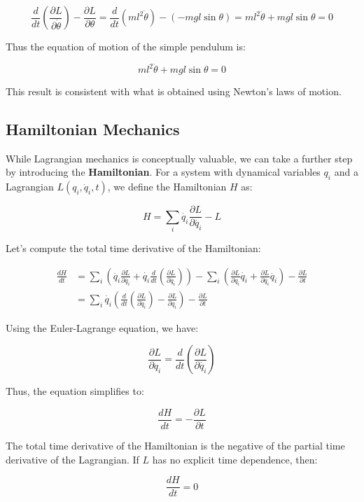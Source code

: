 \[
    \frac{d}{dt}\left(\frac{\partial L}{\partial\dot{\theta}}\right) - \frac{\partial L}{\partial\theta} = \frac{d}{dt}(ml^2\dot{\theta}) - (-mgl\sin{\theta})=ml^2\ddot{\theta}+mgl\sin{\theta}=0
\]

Thus the equation of motion of the simple pendulum is:

\[
    ml^2\ddot{\theta}+mgl\sin{\theta}=0
\]

This result is consistent with what is obtained using Newton's laws of motion.

\subsection{Hamiltonian Mechanics}

While Lagrangian mechanics is conceptually valuable, we can take a further step by 
introducing the \textbf{Hamiltonian}. For a system with dynamical variables $q_i$ and a 
Lagrangian $L(q_i, \dot{q}_i, t)$, we define the Hamiltonian $H$ as:

\[
    H=\sum_i \dot{q_i} \frac{\partial L}{\partial \dot{q_i}} - L
\]

Let's compute the total time derivative of the Hamiltonian:

\begin{align*}
   \frac{dH}{dt}&=\sum_i \left(\ddot{q_i} \frac{\partial L}{\partial \dot{q_i}} + \dot{q_i} \frac{d}{dt} \left(\frac{\partial L}{\partial \dot{q_i}}\right)\right) - \sum_i \left(\frac{\partial L}{\partial q_i} \dot{q_i} + \frac{\partial L}{\partial \dot{q_i}} \ddot{q_i} \right) - \frac{\partial L}{\partial t}\\
   &=\sum_i\dot{q_i}\left(\frac{d}{dt} \left(\frac{\partial L}{\partial \dot{q_i}}\right)-\frac{\partial L}{\partial q_i}\right)-\frac{\partial L}{\partial t}
\end{align*}

Using the Euler-Lagrange equation, we have:

\[
    \frac{\partial L}{\partial q_i}=\frac{d}{dt} \left(\frac{\partial L}{\partial \dot{q_i}}\right)
\]

Thus, the equation simplifies to:

\[
    \frac{dH}{dt}=-\frac{\partial L}{\partial t}
\]

The total time derivative of the Hamiltonian is the negative of the partial time 
derivative of the Lagrangian. If $L$ has no explicit time dependence, then:

\[
    \frac{dH}{dt}=0
\]

